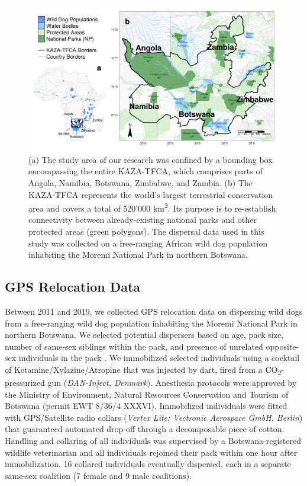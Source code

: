 \documentclass[abstract=on,10pt,a4paper,bibliography=totocnumbered]{article}
\begin{document}
\begin{figure}[htbp]
  \begin{center}
    \includegraphics[width = \textwidth]{99_StudyArea.png}
    \caption{(a) The study area of our research was confined by a bounding box
    encompassing the entire KAZA-TFCA, which comprises parts of Angola, Namibia,
    Botswana, Zimbabwe, and Zambia. (b) The KAZA-TFCA represents the world's
    largest terrestrial conservation area and covers a total of 520'000
    km\textsuperscript{2}. Its purpose is to re-establish connectivity between
    already-existing national parks and other protected areas (green polygons).
    The dispersal data used in this study was collected on a free-ranging
    African wild dog population inhabiting the Moremi National Park in northern
    Botswana.}
    \label{StudyArea}
  \end{center}
\end{figure}

\subsection{GPS Relocation Data}
Between 2011 and 2019, we collected GPS relocation data on dispersing wild dogs
from a free-ranging wild dog population inhabiting the Moremi National Park in
northern Botswana. We selected potential dispersers based on age, pack size,
number of same‐sex siblings within the pack, and presence of unrelated
opposite-sex individuals in the pack \citep{McNutt.1996, Behr.2020}. We
immobilized selected individuals using a cocktail of Ketamine/Xylazine/Atropine
\citep{Osofsky.1996, Cozzi.2020} that was injected by dart, fired from a
CO\textsubscript{2}-pressurized gun (\textit{DAN-Inject, Denmark}). Anesthesia
protocols were approved by the Ministry of Environment, Natural Resources
Conservation and Tourism of Botswana (permit EWT 8/36/4 XXXVI). Immobilized
individuals were fitted with GPS/Satellite radio collars (\textit{Vertex Lite;
Vectronic Aerospace GmbH, Berlin}) that guaranteed automated drop-off through a
decomposable piece of cotton. Handling and collaring of all individuals was
supervised by a Botswana-registered wildlife veterinarian and all individuals
rejoined their pack within one hour after immobilization. 16 collared
individuals eventually dispersed, each in a separate same-sex coalition (7
female and 9 male coalitions).
\end{document}
